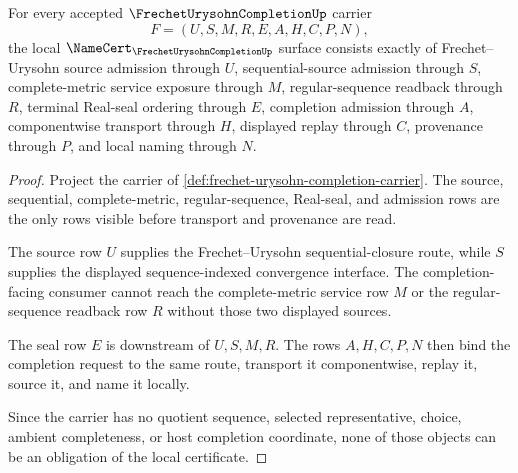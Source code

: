\begin{theorem}
\label{thm:frechet-urysohn-completion-namecert-obligations}
For every accepted $\FrechetUrysohnCompletionUp$ carrier
$$
F=(U,S,M,R,E,A,H,C,P,N),
$$
the local $\NameCert_{\FrechetUrysohnCompletionUp}$ surface consists exactly of Frechet--Urysohn source admission through $U$, sequential-source admission through $S$, complete-metric service exposure through $M$, regular-sequence readback through $R$, terminal Real-seal ordering through $E$, completion admission through $A$, componentwise transport through $H$, displayed replay through $C$, provenance through $P$, and local naming through $N$.
\end{theorem}
\begin{proof}
Project the carrier of \autoref{def:frechet-urysohn-completion-carrier}. The source, sequential, complete-metric, regular-sequence, Real-seal, and admission rows are the only rows visible before transport and provenance are read.

The source row $U$ supplies the Frechet--Urysohn sequential-closure route, while $S$ supplies the displayed sequence-indexed convergence interface. The completion-facing consumer cannot reach the complete-metric service row $M$ or the regular-sequence readback row $R$ without those two displayed sources.

The seal row $E$ is downstream of $U,S,M,R$. The rows $A,H,C,P,N$ then bind the completion request to the same route, transport it componentwise, replay it, source it, and name it locally.

Since the carrier has no quotient sequence, selected representative, choice, ambient completeness, or host completion coordinate, none of those objects can be an obligation of the local certificate.
\end{proof}

